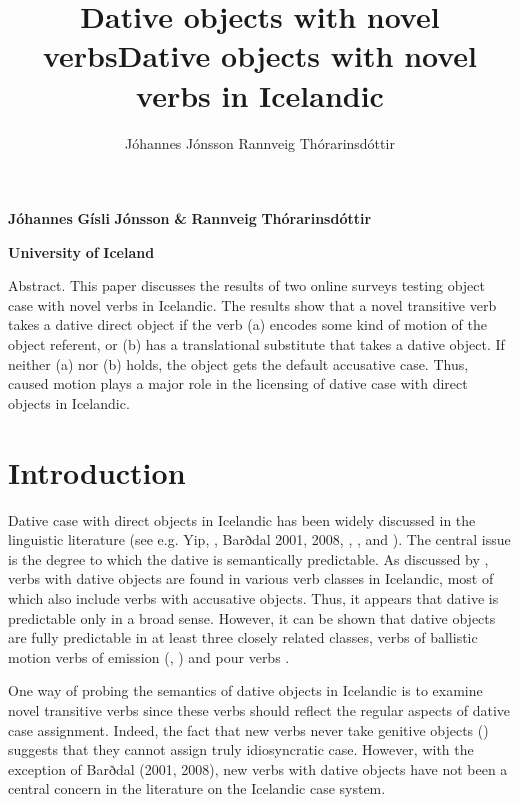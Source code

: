 \documentclass[output=paper,modfonts,nonflat]{langsci/langscibook}
\author{Jóhannes Jónsson\affiliation{}\lastand
Rannveig Thórarinsdóttir\affiliation{}}
\title{Dative objects with novel verbs}
\begin{document}
\maketitle 

\title{Dative objects with novel verbs in Icelandic} 

\textbf{Jóhannes} \textbf{Gísli} \textbf{Jónsson} \textbf{\&} \textbf{Rannveig} \textbf{Thórarinsdóttir}

\textbf{University} \textbf{of} \textbf{Iceland}

\begin{stylelsAbstract}
Abstract. This paper discusses the results of two online surveys testing object case with novel verbs in Icelandic. The results show that a novel transitive verb takes a dative direct object if the verb (a) encodes some kind of motion of the object referent, or (b) has a translational substitute that takes a dative object. If neither (a) nor (b) holds, the object gets the default accusative case. Thus, caused motion plays a major role in the licensing of dative case with direct objects in Icelandic.
\end{stylelsAbstract}

\section{Introduction} %

Dative case with direct objects in Icelandic has been widely discussed in the linguistic literature (see e.g. Yip, \citealt{MalingJackendoff1987}, Barðdal 2001, 2008, \citealt{Svenonius2002}, \citealt{Maling2002}, and \citealt{Jónsson2013a}). The central issue is the degree to which the dative is semantically predictable. As discussed by \citet{Maling2002}, verbs with dative objects are found in various verb classes in Icelandic, most of which also include verbs with accusative objects. Thus, it appears that dative is predictable only in a broad sense. However, it can be shown that dative objects are fully predictable in at least three closely related classes, verbs of ballistic motion \citep{Svenonius2002} verbs of emission (\citealt{Maling2002}, \citealt{Jónsson2013a}) and pour verbs \citep{Jónsson2013a}.

One way of probing the semantics of dative objects in Icelandic is to examine novel transitive verbs since these verbs should reflect the regular aspects of dative case assignment. Indeed, the fact that new verbs never take genitive objects (\citealt{JónssonEythórsson2011}) suggests that they cannot assign truly idiosyncratic case. However, with the exception of Barðdal (2001, 2008), new verbs with dative objects have not been a central concern in the literature on the Icelandic case system. 
\end{document}
